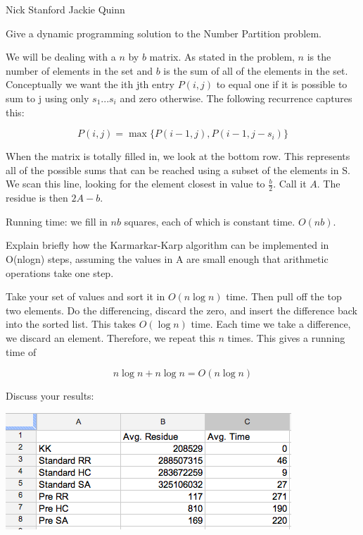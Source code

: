 \documentclass[solution, letterpaper]{cs124}
\begin{document}


\setcounter{Part}{1}
 \begin{center}
Nick Stanford Jackie Quinn
 \end{center}

\problem{} 
Give a dynamic programming solution to the Number Partition problem.

\subsolution


We will be dealing with a $n$ by $b$ matrix. As stated in the problem, $n$ is the number of elements in the set and $b$ is the sum of all of the elements in the set. Conceptually we want the ith jth entry $P(i,j)$ to equal one if it is possible to sum to j using only $s_1 ... s_i$ and zero otherwise. The following recurrence captures this:

$$P(i,j) = \max{\{P(i-1,j), P(i-1,j-s_i)\}} $$

When the matrix is totally filled in, we look at the bottom row. This represents all of the possible sums that can be reached using a subset of the elements in S. We scan this line, looking for the element closest in value to $\frac{b}{2}$. Call it $A$. The residue is then $2A-b$.

Running time: we fill in $nb$ squares, each of which is constant time. $O(nb)$. 

\problem{} 
Explain brieﬂy how the Karmarkar-Karp algorithm can be implemented in O(nlogn) steps, assuming the values in A are small enough that arithmetic operations take one step.

\subsolution Take your set of values and sort it in $O(n \log{n})$ time. Then pull off the top two elements. Do the differencing, discard the zero, and insert the difference back into the sorted list. This takes $O(\log{n})$ time. Each time we take a difference, we discard an element. Therefore, we repeat this $n$ times. This gives a running time of

$$ n \log{n} + n \log{n} = O(n\log{n}) $$

\problem{}
Discuss your results:

\includegraphics[scale=0.50]{PA3results} \\
\end{document}
